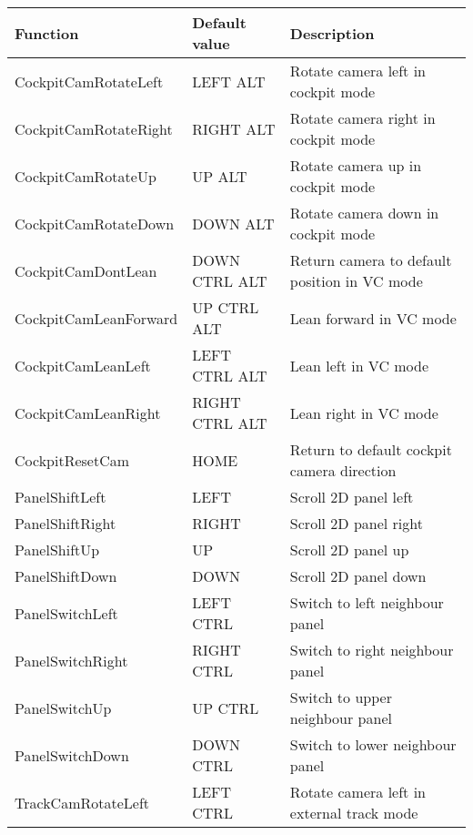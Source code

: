\documentclass[Orbiter User Manual.tex]{subfiles}
\begin{document}
	\begin{longtable}{ |p{}|p{}|p{}| }
	\hline\rule{0pt}{2ex}
	\textbf{Function} & \textbf{Default value} & \textbf{Description}\\
	\hline\rule{0pt}{2ex}
	CockpitCamRotateLeft & LEFT ALT & Rotate camera left in cockpit mode\\
	\hline\rule{0pt}{2ex}
	CockpitCamRotateRight & RIGHT ALT & Rotate camera right in cockpit mode\\
	\hline\rule{0pt}{2ex}
	CockpitCamRotateUp & UP ALT & Rotate camera up in cockpit mode\\
	\hline\rule{0pt}{2ex}
	CockpitCamRotateDown & DOWN ALT & Rotate camera down in cockpit mode\\
	\hline\rule{0pt}{2ex}
	CockpitCamDontLean & DOWN CTRL ALT & Return camera to default position in VC mode\\
	\hline\rule{0pt}{2ex}
	CockpitCamLeanForward & UP CTRL ALT & Lean forward in VC mode\\
	\hline\rule{0pt}{2ex}
	CockpitCamLeanLeft & LEFT CTRL ALT & Lean left in VC mode\\
	\hline\rule{0pt}{2ex}
	CockpitCamLeanRight & RIGHT CTRL ALT & Lean right in VC mode\\
	\hline\rule{0pt}{2ex}
	CockpitResetCam & HOME & Return to default cockpit camera direction\\
	\hline\rule{0pt}{2ex}
	PanelShiftLeft & LEFT & Scroll 2D panel left\\
	\hline\rule{0pt}{2ex}
	PanelShiftRight & RIGHT & Scroll 2D panel right\\
	\hline\rule{0pt}{2ex}
	PanelShiftUp & UP & Scroll 2D panel up\\
	\hline\rule{0pt}{2ex}
	PanelShiftDown & DOWN & Scroll 2D panel down\\
	\hline\rule{0pt}{2ex}
	PanelSwitchLeft & LEFT CTRL & Switch to left neighbour panel\\
	\hline\rule{0pt}{2ex}
	PanelSwitchRight & RIGHT CTRL & Switch to right neighbour panel\\
	\hline\rule{0pt}{2ex}
	PanelSwitchUp & UP CTRL & Switch to upper neighbour panel\\
	\hline\rule{0pt}{2ex}
	PanelSwitchDown & DOWN CTRL & Switch to lower neighbour panel\\
	\hline\rule{0pt}{2ex}
	TrackCamRotateLeft & LEFT CTRL & Rotate camera left in external track mode\\

\end{longtable}
\end{document}
